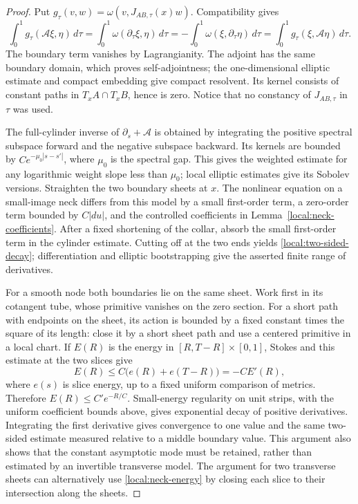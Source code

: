 \begin{proof}
Put $g_\tau(v,w)=\omega(v,J_{AB,\tau}(x)w)$.  Compatibility gives
\[
 \int_0^1g_\tau(\mathcal A\xi,\eta)\,d\tau
   =\int_0^1\omega(\partial_\tau\xi,\eta)\,d\tau
   =-\int_0^1\omega(\xi,\partial_\tau\eta)\,d\tau
   =\int_0^1g_\tau(\xi,\mathcal A\eta)\,d\tau.
\]
The boundary term vanishes by Lagrangianity.  The adjoint has the same
boundary domain, which proves self-adjointness; the one-dimensional
elliptic estimate and compact embedding give compact resolvent.
Its kernel consists of constant paths in $T_xA\cap T_xB$, hence is zero.
Notice that no constancy of $J_{AB,\tau}$ in $\tau$ was used.

The full-cylinder inverse of $\partial_s+\mathcal A$ is obtained by
integrating the positive spectral subspace forward and the negative
subspace backward.  Its kernels are bounded by $Ce^{-\mu_0|s-s'|}$,
where $\mu_0$ is the spectral gap.  This gives the weighted estimate for
any logarithmic weight slope less than $\mu_0$; local elliptic estimates
give its Sobolev versions.  Straighten the two boundary sheets at $x$.
The nonlinear equation on a small-image neck differs from this model
by a small first-order term, a zero-order term bounded by $C|du|$, and
the controlled coefficients in Lemma~\ref{local:neck-coefficients}.
After a fixed shortening of the collar, absorb the small first-order
term in the cylinder estimate.  Cutting off at the two ends yields
\eqref{local:two-sided-decay}; differentiation and elliptic bootstrapping
give the asserted finite range of derivatives.

For a smooth node both boundaries lie on the same sheet.  Work first
in its cotangent tube, whose primitive vanishes on the zero section.
For a short path with endpoints on the sheet, its action is bounded
by a fixed constant times the square of its length: close it by a
short sheet path and use a centered primitive in a local chart.  If
$E(R)$ is the energy in $[R,T-R]\times[0,1]$, Stokes and this estimate
at the two slices give
\begin{equation}\label{local:neck-energy}
 E(R)\leq C\bigl(e(R)+e(T-R)\bigr)=-C E'(R),
\end{equation}
where $e(s)$ is slice energy, up to a fixed uniform comparison of
metrics.  Therefore $E(R)\leq C'e^{-R/C}$.  Small-energy regularity on
unit strips, with the uniform coefficient bounds above, gives
exponential decay of positive derivatives.  Integrating the first
derivative gives convergence to one value and the same two-sided
estimate measured relative to a middle boundary value.  This argument
also shows that the constant asymptotic mode must be retained, rather
than estimated by an invertible transverse model.  The argument for
two transverse sheets can alternatively use \eqref{local:neck-energy}
by closing each slice to their intersection along the sheets.
\end{proof}

